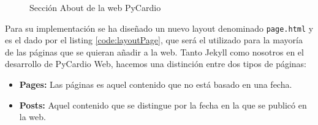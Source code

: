 \begin{figure}[H]
    \centering
    \caption{Sección About de la web PyCardio}
    \label{fig:aboutWeb}
\end{figure}

Para su implementación se ha diseñado un nuevo layout denominado \texttt{page.html} y es el dado por el listing \ref{code:layoutPage}, que será el utilizado para la mayoría de las páginas que se quieran añadir a la web. Tanto Jekyll como nosotros en el desarrollo de PyCardio Web, hacemos una distinción entre dos tipos de páginas:

\begin{itemize}
    \item \textbf{Pages: } Las páginas es aquel contenido que no está basado en una fecha.
    \item \textbf{Posts: } Aquel contenido que se distingue por la fecha en la que se publicó en la web.
\end{itemize}

